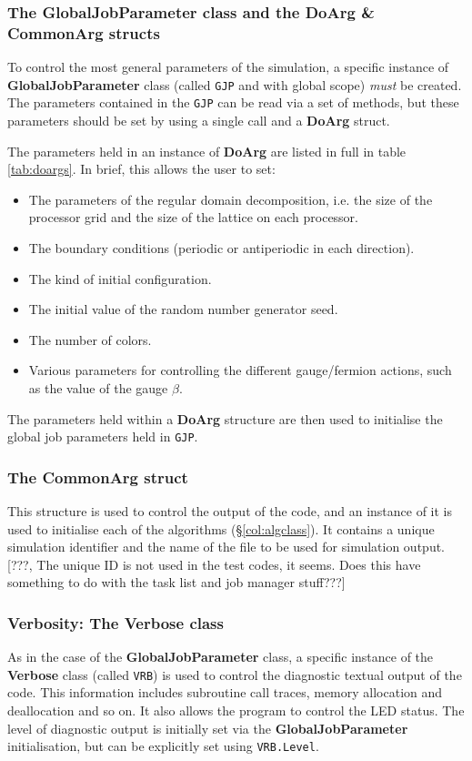 \documentclass[12pt]{article}
\newcommand{\cls}[1]{{\bf #1}}            %
\newcommand{\struct}[1]{{\bf #1}}         %
\newcommand{\cde}[1]{{\tt #1}}            %
\begin{document}
\subsubsection{The GlobalJobParameter class and the DoArg \& CommonArg structs}
\label{col:gjp}
To control the most general parameters of the simulation, a specific  instance
of \cls{GlobalJobParameter} class (called \cde{GJP} and with global scope)
\emph{must} be created. The parameters contained in the \cde{GJP} can
be read via a set of methods, but these parameters should be set by
using a single call and a \struct{DoArg} struct.

The parameters held in an instance of \struct{DoArg} are listed in full
in table \ref{tab:doargs}.  In brief, this allows the user to set:
\begin{itemize}
 \item The parameters of the regular domain decomposition, i.e. the
 size of the processor grid and the size of the lattice on each
 processor.
 \item The boundary conditions (periodic or antiperiodic in each
 direction).
 \item The kind of initial configuration.
 \item The initial value of the random number generator seed.
 \item The number of colors.
 \item Various parameters for controlling the different gauge/fermion actions,
 such as the value of the gauge $\beta$.
\end{itemize}
The parameters held within a \struct{DoArg} structure are then used to
initialise the global job parameters held in \cde{GJP}.

\subsubsection{The CommonArg struct}
\label{col:commarg}
This structure is used to control the output of the code, and an
instance of it is used to initialise each of the algorithms
(\S\ref{col:algclass}).  It contains a unique simulation identifier
and the name of the file to be used for simulation output.
[???, The unique ID is not used in the test codes, it seems.  Does
this have something to do with the task list and job manager stuff???]

\subsubsection{Verbosity: The Verbose class}
\label{col:verboseclass}
As in the case of the \cls{GlobalJobParameter} class, a specific
instance of the \cls{Verbose} class (called \cde{VRB}) is used to control
the diagnostic textual output of the code.  This information includes
subroutine call traces, memory allocation and deallocation and so on.
It also allows the program to control the LED status.  The level of
diagnostic output is initially set via the \cls{GlobalJobParameter}
initialisation, but can be explicitly set using \cde{VRB.Level}.
\end{document}
